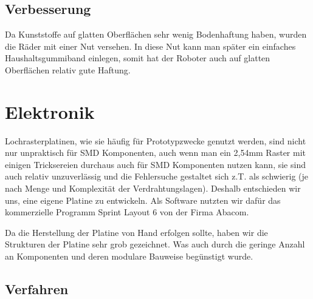 \documentclass{article}
\begin{document}
\subsection{Verbesserung}
Da Kunststoffe auf glatten Oberflächen sehr wenig Bodenhaftung haben, wurden die Räder mit einer Nut versehen. In diese Nut kann man später ein einfaches Haushaltsgummiband einlegen, somit hat der Roboter auch auf glatten Oberflächen relativ gute Haftung.

\newpage    
\section{Elektronik}%

Lochrasterplatinen, wie sie häufig für Prototypzwecke genutzt werden, sind nicht nur unpraktisch für SMD Komponenten, auch wenn man ein 2,54mm Raster mit einigen Tricksereien durchaus auch für SMD Komponenten nutzen kann, sie sind auch relativ unzuverlässig und die Fehlersuche gestaltet sich z.T. als schwierig (je nach Menge und Komplexität der Verdrahtungslagen).
Deshalb entschieden wir uns, eine eigene Platine zu entwickeln.
Als Software nutzten wir dafür das kommerzielle Programm Sprint Layout 6 von der Firma Abacom.

Da die Herstellung der Platine von Hand erfolgen sollte, haben wir die Strukturen der Platine sehr grob gezeichnet. Was auch durch die geringe Anzahl an Komponenten und deren modulare Bauweise begünstigt wurde.

\subsection{Verfahren}%
\end{document}
